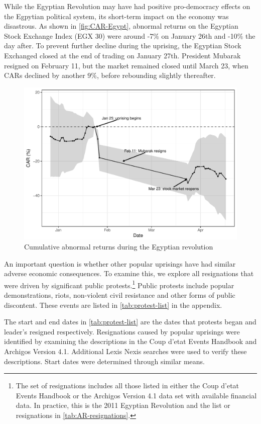 \documentclass[12pt,final,fleqn]{article}
\theoremstyle{plain}
\begin{document}
While the Egyptian Revolution may have had positive pro-democracy effects on the Egpytian political system, its short-term impact on the economy was disastrous. As shown in \autoref{fig:CAR-Egypt}, abnormal returns on the Egyptian Stock Exchange Index (EGX 30) were around -7\% on January 26th and -10\% the day after. To prevent further decline during the uprising, the Egyptian Stock Exchanged closed at the end of trading on January 27th. President Mubarak resigned on February 11, but the market remained closed until March 23, when CARs declined by another 9\%, before rebounding slightly thereafter.

\begin{figure}[!ht]
\includegraphics{../figs/egypt-revolution-2011.pdf}
\caption{Cumulative abnormal returns during the Egyptian revolution}
\label{fig:CAR-Egypt}
\end{figure}

An important question is whether other popular uprisings have had similar adverse economic consequences. To examine this, we explore all resignations that were driven by significant public protests.\footnote{The set of resignations includes all those listed in either the Coup d'etat Events Handbook or the Archigos Version 4.1 data set with available financial data. In practice, this is the 2011 Egyptian Revolution and the list or resignations in \autoref{tab:AR-resignations}.} Public protests include popular demonstrations, riots, non-violent civil resistance and other forms of public discontent. These events are listed in \autoref{tab:protest-list} in the appendix.

The start and end dates in \autoref{tab:protest-list} are the dates that protests began and leader's resigned respectively. Resignations caused by popular uprisings were identified by examining the descriptions in the Coup d'etat Events Handbook and Archigos Version 4.1. Additional Lexis Nexis searches were used to verify these descriptions. Start dates were determined through similar means.
\end{document}
